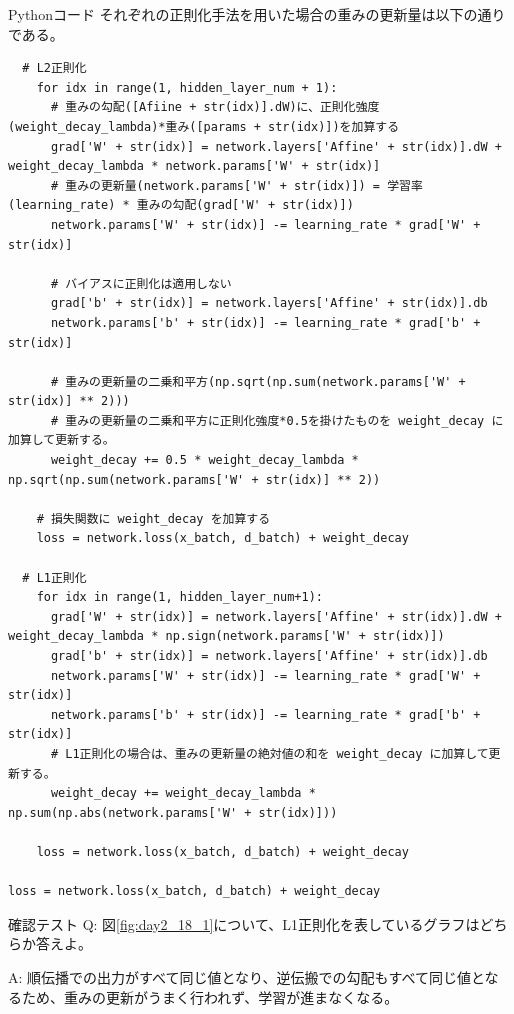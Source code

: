 \documentclass{ltjsarticle}
\begin{document}
\begin{itembox}[l]{Pythonコード}
それぞれの正則化手法を用いた場合の重みの更新量は以下の通りである。

\begin{verbatim}
  # L2正則化
    for idx in range(1, hidden_layer_num + 1): 
      # 重みの勾配([Afiine + str(idx)].dW)に、正則化強度(weight_decay_lambda)*重み([params + str(idx)])を加算する
      grad['W' + str(idx)] = network.layers['Affine' + str(idx)].dW + weight_decay_lambda * network.params['W' + str(idx)]
      # 重みの更新量(network.params['W' + str(idx)]) = 学習率(learning_rate) * 重みの勾配(grad['W' + str(idx)])
      network.params['W' + str(idx)] -= learning_rate * grad['W' + str(idx)]

      # バイアスに正則化は適用しない
      grad['b' + str(idx)] = network.layers['Affine' + str(idx)].db
      network.params['b' + str(idx)] -= learning_rate * grad['b' + str(idx)]

      # 重みの更新量の二乗和平方(np.sqrt(np.sum(network.params['W' + str(idx)] ** 2)))
      # 重みの更新量の二乗和平方に正則化強度*0.5を掛けたものを weight_decay に加算して更新する。
      weight_decay += 0.5 * weight_decay_lambda * np.sqrt(np.sum(network.params['W' + str(idx)] ** 2))

    # 損失関数に weight_decay を加算する
    loss = network.loss(x_batch, d_batch) + weight_decay

  # L1正則化
    for idx in range(1, hidden_layer_num+1):
      grad['W' + str(idx)] = network.layers['Affine' + str(idx)].dW + weight_decay_lambda * np.sign(network.params['W' + str(idx)])
      grad['b' + str(idx)] = network.layers['Affine' + str(idx)].db
      network.params['W' + str(idx)] -= learning_rate * grad['W' + str(idx)]
      network.params['b' + str(idx)] -= learning_rate * grad['b' + str(idx)]
      # L1正則化の場合は、重みの更新量の絶対値の和を weight_decay に加算して更新する。
      weight_decay += weight_decay_lambda * np.sum(np.abs(network.params['W' + str(idx)]))
    
    loss = network.loss(x_batch, d_batch) + weight_decay

loss = network.loss(x_batch, d_batch) + weight_decay
\end{verbatim}
\end{itembox}


\begin{itembox}[l]{確認テスト}
  Q: 図\ref{fig:day2_18_1}について、L1正則化を表しているグラフはどちらか答えよ。

  A: 順伝播での出力がすべて同じ値となり、逆伝搬での勾配もすべて同じ値となるため、重みの更新がうまく行われず、学習が進まなくなる。
\end{itembox}
\end{document}
